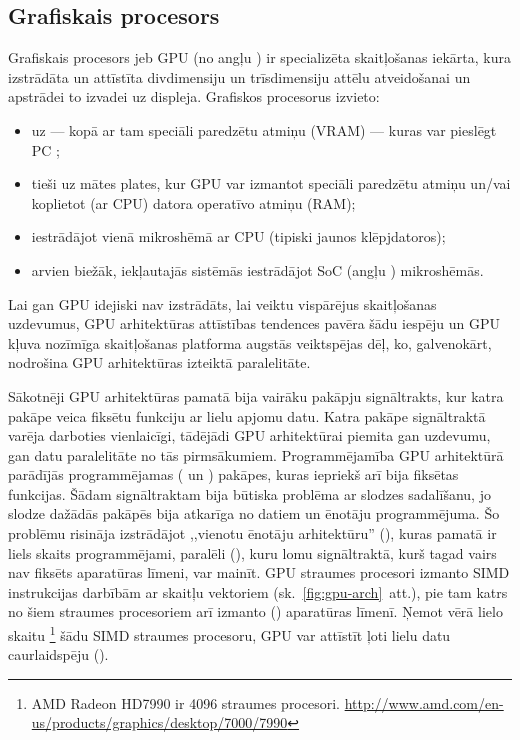 \subsection{Grafiskais procesors} \label{sec:gpu}
Grafiskais procesors jeb GPU (no angļu )
ir specializēta skaitļošanas iekārta, kura izstrādāta
un attīstīta divdimensiju un trīsdimensiju attēlu atveidošanai un apstrādei
to izvadei uz displeja.
Grafiskos procesorus izvieto:
\begin{itemize}
	\item uz  --- kopā ar tam speciāli paredzētu
		atmiņu (VRAM) --- kuras var pieslēgt PC ;
	\item tieši uz mātes plates, kur GPU var izmantot speciāli paredzētu
		atmiņu un/vai koplietot (ar CPU) datora operatīvo atmiņu (RAM);
	\item iestrādājot vienā mikroshēmā ar CPU (tipiski jaunos klēpjdatoros);
	\item arvien biežāk, iekļautajās sistēmās iestrādājot SoC
		(angļu ) mikroshēmās.
\end{itemize}

Lai gan GPU idejiski nav izstrādāts, lai veiktu vispārējus skaitļošanas
uzdevumus, GPU arhitektūras attīstības tendences pavēra šādu iespēju un GPU
kļuva nozīmīga skaitļošanas platforma augstās veiktspējas dēļ, ko,
galvenokārt, nodrošina GPU arhitektūras izteiktā paralelitāte.

Sākotnēji GPU arhitektūras pamatā bija vairāku pakāpju signāltrakts, kur
katra pakāpe veica fiksētu funkciju ar lielu apjomu datu. Katra pakāpe
signāltraktā varēja darboties vienlaicīgi, tādējādi GPU arhitektūrai
piemita gan uzdevumu, gan datu paralelitāte no tās pirmsākumiem.
Programmējamība GPU arhitektūrā parādījās programmējamas 
( un ) pakāpes,
kuras iepriekš arī bija fiksētas funkcijas. Šādam signāltraktam bija būtiska
problēma ar slodzes sadalīšanu, jo slodze dažādās pakāpēs bija atkarīga
no datiem un ēnotāju programmējuma. Šo problēmu risināja izstrādājot
,,vienotu ēnotāju arhitektūru'' (),
kuras pamatā ir liels skaits programmējami, paralēli
 (), kuru lomu
signāltraktā, kurš tagad vairs nav fiksēts aparatūras līmeni, var mainīt.
GPU straumes procesori izmanto SIMD instrukcijas darbībām ar skaitļu
vektoriem (sk.~\ref{fig:gpu-arch}~att.), pie tam katrs no šiem straumes procesoriem
arī izmanto  () aparatūras
līmenī. Ņemot vērā lielo skaitu%
\footnote{AMD Radeon HD7990 ir 4096 straumes procesori.
	\url{http://www.amd.com/en-us/products/graphics/desktop/7000/7990}}
šādu SIMD straumes procesoru, GPU var attīstīt ļoti lielu datu caurlaidspēju
().
\cite{Fatahalian}\cite{Owens-GPU}

